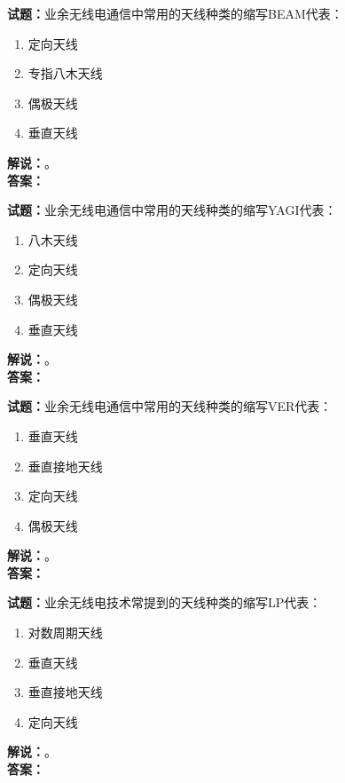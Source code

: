 \documentclass{ctexbook}
\begin{document}
\bigskip




\noindent\textbf{试题：}业余无线电通信中常用的天线种类的缩写BEAM代表：
\begin{enumerate}[leftmargin=3em]
\item 定向天线
\item 专指八木天线
\item 偶极天线
\item 垂直天线
\end{enumerate}
\noindent\textbf{解说：}\textbf{}。\\\noindent\textbf{答案：}

\bigskip




\noindent\textbf{试题：}业余无线电通信中常用的天线种类的缩写YAGI代表：
\begin{enumerate}[leftmargin=3em]
\item 八木天线
\item 定向天线
\item 偶极天线
\item 垂直天线
\end{enumerate}
\noindent\textbf{解说：}\textbf{}。\\\noindent\textbf{答案：}

\bigskip




\noindent\textbf{试题：}业余无线电通信中常用的天线种类的缩写VER代表：
\begin{enumerate}[leftmargin=3em]
\item 垂直天线
\item 垂直接地天线
\item 定向天线
\item 偶极天线
\end{enumerate}
\noindent\textbf{解说：}\textbf{}。\\\noindent\textbf{答案：}

\bigskip




\noindent\textbf{试题：}业余无线电技术常提到的天线种类的缩写LP代表：
\begin{enumerate}[leftmargin=3em]
\item 对数周期天线
\item 垂直天线
\item 垂直接地天线
\item 定向天线
\end{enumerate}
\noindent\textbf{解说：}\textbf{}。\\\noindent\textbf{答案：}
\end{document}
